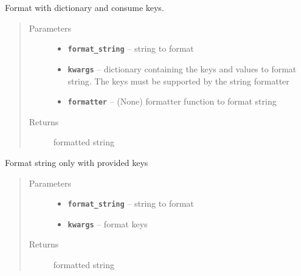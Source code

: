 \documentclass[letterpaper,10pt,english]{sphinxmanual}
\begin{document}

\begin{fulllineitems}
\label{RRtoolbox.lib:RRtoolbox.lib.root.formatConsume}
Format with dictionary and consume keys.
\begin{quote}\begin{description}
\item[{Parameters}] \leavevmode\begin{itemize}
\item {} 
\textbf{\texttt{format\_string}} -- string to format

\item {} 
\textbf{\texttt{kwargs}} -- dictionary containing the keys and values to format string.
The keys must be supported by the string formatter

\item {} 
\textbf{\texttt{formatter}} -- (None) formatter function to format string

\end{itemize}

\item[{Returns}] \leavevmode
formatted string

\end{description}\end{quote}

\end{fulllineitems}


\begin{fulllineitems}
\label{RRtoolbox.lib:RRtoolbox.lib.root.formatOnly}
Format string only with provided keys
\begin{quote}\begin{description}
\item[{Parameters}] \leavevmode\begin{itemize}
\item {} 
\textbf{\texttt{format\_string}} -- string to format

\item {} 
\textbf{\texttt{kwargs}} -- format keys

\end{itemize}

\item[{Returns}] \leavevmode
formatted string

\end{description}\end{quote}

\end{fulllineitems}
\end{document}
